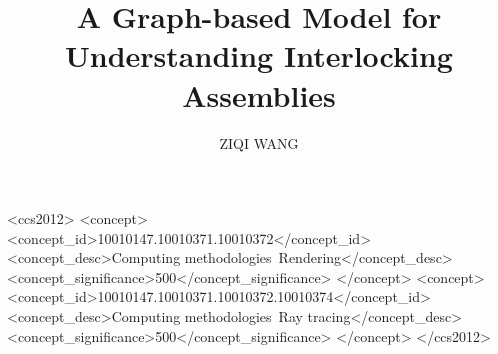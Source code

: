 \documentclass[acmtog]{acmart}
\begin{document}
\title{A Graph-based Model for Understanding Interlocking Assemblies}



\author{ZIQI WANG}





 


\begin{CCSXML}
<ccs2012>
<concept>
<concept_id>10010147.10010371.10010372</concept_id>
<concept_desc>Computing methodologies~Rendering</concept_desc>
<concept_significance>500</concept_significance>
</concept>
<concept>
<concept_id>10010147.10010371.10010372.10010374</concept_id>
<concept_desc>Computing methodologies~Ray tracing</concept_desc>
<concept_significance>500</concept_significance>
</concept>
</ccs2012>
\end{CCSXML}


\fi


\maketitle
\end{document}
